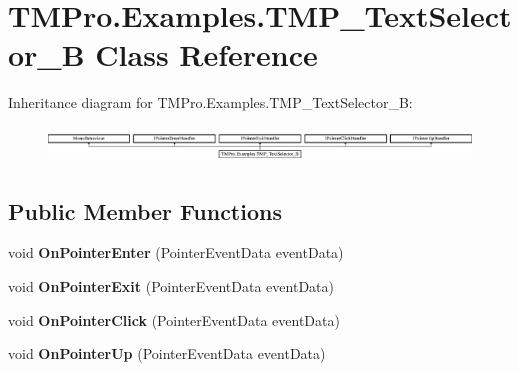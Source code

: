\hypertarget{class_t_m_pro_1_1_examples_1_1_t_m_p___text_selector___b}{}\section{T\+M\+Pro.\+Examples.\+T\+M\+P\+\_\+\+Text\+Selector\+\_\+B Class Reference}
\label{class_t_m_pro_1_1_examples_1_1_t_m_p___text_selector___b}
Inheritance diagram for T\+M\+Pro.\+Examples.\+T\+M\+P\+\_\+\+Text\+Selector\+\_\+B\+:\begin{figure}[H]
\begin{center}
\leavevmode
\includegraphics[height=0.945148cm]{class_t_m_pro_1_1_examples_1_1_t_m_p___text_selector___b}
\end{center}
\end{figure}
\subsection*{Public Member Functions}
\begin{DoxyCompactItemize}
\item 
\mbox{\label{class_t_m_pro_1_1_examples_1_1_t_m_p___text_selector___b_ae7830c3581122852db867ca0e728c2a8}} 
void {\bfseries On\+Pointer\+Enter} (Pointer\+Event\+Data event\+Data)
\item 
\mbox{\label{class_t_m_pro_1_1_examples_1_1_t_m_p___text_selector___b_adaec8e4a30998ce95981f29f92ced137}} 
void {\bfseries On\+Pointer\+Exit} (Pointer\+Event\+Data event\+Data)
\item 
\mbox{\label{class_t_m_pro_1_1_examples_1_1_t_m_p___text_selector___b_ad0a0f7e8a9485a0980bb873f31e18e41}} 
void {\bfseries On\+Pointer\+Click} (Pointer\+Event\+Data event\+Data)
\item 
\mbox{\label{class_t_m_pro_1_1_examples_1_1_t_m_p___text_selector___b_a2e36cc0ea424f43ad1e4ca6e3cdcf1b0}} 
void {\bfseries On\+Pointer\+Up} (Pointer\+Event\+Data event\+Data)
\end{DoxyCompactItemize}
